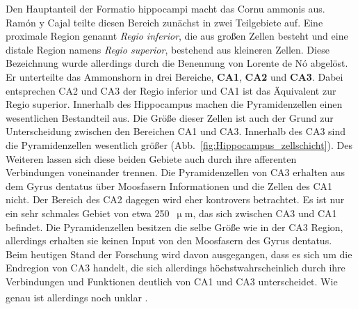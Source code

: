 Den Hauptanteil der Formatio hippocampi macht das Cornu ammonis aus. Ramón y Cajal teilte diesen Bereich zunächst in zwei Teilgebiete auf. Eine proximale Region genannt \textit{Regio inferior}, die aus großen Zellen besteht und eine distale Region namens \textit{Regio superior}, bestehend aus kleineren Zellen. Diese Bezeichnung wurde allerdings durch die Benennung von Lorente de Nó abgelöst. Er unterteilte das Ammonshorn in drei Bereiche, \textbf{CA1}, \textbf{CA2} und \textbf{CA3}. Dabei entsprechen CA2 und CA3 der Regio inferior und CA1 ist das Äquivalent zur Regio superior. Innerhalb des Hippocampus machen die Pyramidenzellen einen wesentlichen Bestandteil aus. Die Größe dieser Zellen ist auch der Grund zur Unterscheidung zwischen den Bereichen CA1 und CA3. Innerhalb des CA3 sind die Pyramidenzellen wesentlich größer (Abb.~\ref{fig:Hippocampus_zellschicht}). Des Weiteren lassen sich diese beiden Gebiete auch durch ihre afferenten Verbindungen voneinander trennen. Die Pyramidenzellen von CA3 erhalten aus dem Gyrus dentatus über Moosfasern Informationen und die Zellen des CA1 nicht. Der Bereich des CA2 dagegen wird eher kontrovers betrachtet. Es ist nur ein sehr schmales Gebiet von etwa 250~$\upmu$m, das sich zwischen CA3 und CA1 befindet. Die Pyramidenzellen besitzen die selbe Größe wie in der CA3 Region, allerdings erhalten sie keinen Input von den Moosfasern des Gyrus dentatus. Beim heutigen Stand der Forschung wird davon ausgegangen, dass es sich um die Endregion von CA3 handelt, die sich allerdings höchstwahrscheinlich durch ihre Verbindungen und Funktionen deutlich von CA1 und CA3 unterscheidet. Wie genau ist allerdings noch unklar \textsuperscript{\cite[Kap.~20]{paxinos2014rat}}.\\
